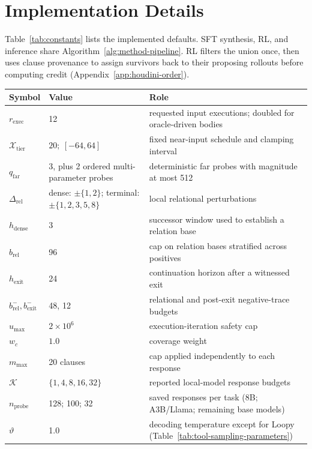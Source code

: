 \section{Implementation Details}
\label{app:constants}

Table~\ref{tab:constants} lists the implemented defaults.  SFT synthesis,
RL, and inference share Algorithm~\ref{alg:method-pipeline}.  RL filters the
union once, then uses clause provenance to assign survivors back to their
proposing rollouts before computing credit
(Appendix~\ref{app:houdini-order}).

\begin{table}[H]
\centering
\begin{tabular}{p{2.6cm}p{3.1cm}p{5.9cm}}
\toprule
\rowcolor{algobg}
\textbf{Symbol} & \textbf{Value} & \textbf{Role} \\
\midrule
\(r_{\mathrm{exec}}\) & 12 & requested input executions; doubled for oracle-driven bodies \\
\(\mathcal X_{\mathrm{tier}}\) & \(20;\ [-64,64]\) & fixed near-input schedule and clamping interval \\
\(q_{\mathrm{far}}\) & 3, plus 2 ordered multi-parameter probes & deterministic far probes with magnitude at most 512 \\
\(\Delta_{\mathrm{rel}}\) & dense: \(\pm\{1,2\}\); terminal: \(\pm\{1,2,3,5,8\}\) & local relational perturbations \\
\(h_{\mathrm{dense}}\) & 3 & successor window used to establish a relation base \\
\(b_{\mathrm{rel}}\) & 96 & cap on relation bases stratified across positives \\
\(h_{\mathrm{exit}}\) & 24 & continuation horizon after a witnessed exit \\
\(b^-_{\mathrm{rel}},b^-_{\mathrm{exit}}\) & 48, 12 & relational and post-exit negative-trace budgets \\
\(u_{\max}\) & \(2\times10^6\) & execution-iteration safety cap \\
\midrule
\(w_c\) & \(1.0\) & coverage weight \\
\(m_{\max}\) & 20 clauses & cap applied independently to each response \\
\(\mathcal K\) & \(\{1,4,8,16,32\}\) & reported local-model response budgets \\
\(n_{\mathrm{probe}}\) & 128; 100; 32 & saved responses per task (8B; A3B/Llama; remaining base models) \\
\(\vartheta\) & 1.0 & decoding temperature except for Loopy (Table~\ref{tab:tool-sampling-parameters}) \\

\end{tabular}
\end{table}
